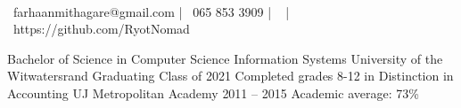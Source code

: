 \documentclass[]{awesome-cv}
\begin{document}
    
\begin{center}
	  \\
	\vspace{2mm}
	{\faEnvelope\ farhaanmithagare@gmail.com} | {\faMobile\ 065 853 3909} | {\faMapMarker\ } | {\faLink\ https://github.com/RyotNomad}
\end{center}



\begin{cventries}
	\cventry
	{Bachelor of Science in Computer Science \textbar{} Information Systems}
	{University of the Witwatersrand}
	{}
	{Graduating Class of 2021}
	{}
	\cventry
	{Completed grades 8-12 in Distinction in Accounting}
	{UJ Metropolitan Academy}
	{}
	{2011 – 2015}
	{Academic average: 73\%}
\end{cventries}

\vspace{-2mm}
\end{document}
